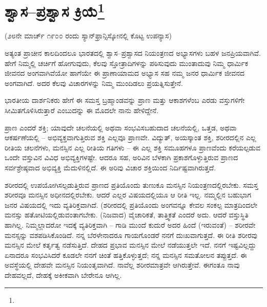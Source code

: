 
\chapter[ಶ್ವಾಸ–ಪ್ರಶ್ವಾಸ ಕ್ರಿಯೆ]{ಶ್ವಾಸ–ಪ್ರಶ್ವಾಸ ಕ್ರಿಯೆ\protect\footnote{}}

\begin{center}
(೨೮ನೇ ಮಾರ್ಚ್ ೧೯೦೦ ರಂದು ಸ್ಯಾನ್‌ಫ್ರಾನ್ಸಿಸ್ಕೋನಲ್ಲಿ ಕೊಟ್ಟ ಉಪನ್ಯಾಸ)
\end{center}

ಅತ್ಯಂತ ಪ್ರಾಚೀನ ಕಾಲದಿಂದಲೂ ಭಾರತದಲ್ಲಿ ಶ್ವಾಸ–ಪ್ರಶ್ವಾಸದ ನಿಯಂತ್ರಣದ ಅಭ್ಯಾಸಗಳು ಬಹಳ ಜನಪ್ರಿಯವಾಗಿವೆ. ಹೇಗೆ ನಿಮ್ಮಲ್ಲಿ ಚರ್ಚಿಗೆ ಹೋಗುವುದು, ಕೆಲವು ಸ್ತೋತ್ರಾದಿಗಳನ್ನು ಪಠಿಸುವುದು ಮುಂತಾದುವು ನಿಮ್ಮ ಧಾರ್ಮಿಕ ಜೀವನದ ಅಂಗವಾಗಿವೆಯೋ ಹಾಗೆಯೇ ಈ ಪ್ರಾಣಾಯಾಮದ ಅಭ್ಯಾಸ ಸಹ ನಮ್ಮ ಜನರ ಧಾರ್ಮಿಕ ಜೀವನದ ಅಂಗವಾಗಿದೆ. ಅದರ ಕೆಲವು ವಿಚಾರಗಳನ್ನು ನಿಮ್ಮ ಮುಂದಿಡಲು ಪ್ರಯತ್ನಿಸುತ್ತೇನೆ.

\vskip 1.5pt

ಭಾರತೀಯ ದಾರ್ಶನಿಕರು ಹೇಗೆ ಈ ಸಮಸ್ತ ಬ್ರಹ್ಮಾಂಡವನ್ನು ಪ್ರಾಣ ಮತ್ತು ಆಕಾಶಗಳೆಂಬ ಎರಡು ವಸ್ತುಗಳಿಗೇ ಸೀಮಿತಗೊಳಿಸಿರುತ್ತಾರೆ ಎಂಬುದನ್ನು ಈ ಮೊದಲೇ ನಾನು ಹೇಳಿದ್ದೇನೆ.

\vskip 1.5pt

ಪ್ರಾಣ ಎಂದರೆ ಶಕ್ತಿ; ಯಾವುದೇ ಚಲನೆಯಲ್ಲಿ ಅಥವಾ ಸಂಭವಿಸಬಹುದಾದ ಚಲನೆಯಲ್ಲಿ, ಒತ್ತಡ, ಅಥವಾ ಆಕರ್ಷಣೆಯಲ್ಲಿ – ಅಭಿವ್ಯಕ್ತವಾಗುತ್ತಿರುವ ಶಕ್ತಿ ಎಲ್ಲವೂ ಪ್ರಾಣವೇ. ವಿದ್ಯುತ್, ಅಯಸ್ಕಾಂತ ಶಕ್ತಿ, ಶರೀರದಲ್ಲಿನ ಎಲ್ಲ ರೀತಿಯ ಚಲನೆಗಳು, ಮನಸ್ಸಿನ ಎಲ್ಲ ರೀತಿಯ ಗತಿಗಳು – ಈ ಎಲ್ಲ ಶಕ್ತಿ ಸಮೂಹಗಳೂ ಪ್ರಾಣವೆಂದು ಕರೆಯಲ್ಪಡುವ ಒಂದೇ ವಸ್ತುವಿನ ವಿವಿಧ ಅಭಿವ್ಯಕ್ತಿಗಳಷ್ಟೇ. ಆದರೂ ಸಹ, ಅರಿವಿನ ಬೆಳಕಾಗಿ ಪ್ರಕಾಶಗೊಳ್ಳುತ್ತಿರುವ ಪ್ರಾಣದ ಸರ್ವಶ್ರೇಷ್ಠವಾದ ಅಭಿವ್ಯಕ್ತಿ ಮೆದುಳಿನಲ್ಲಿದೆ. ಈ ಅರಿವು ವಿಚಾರ ಶಕ್ತಿಯಿಂದ ನಿರ್ದಿಷ್ಟವಾಗಿರುತ್ತದೆ.

\vskip 1.5pt

ಶರೀರದಲ್ಲಿ ಉಪಯೋಗಿಸಲ್ಪಡುತ್ತಿರುವ ಪ್ರಾಣದ ಪ್ರತಿಯೊಂದು ತುಣುಕೂ ಮನಸ್ಸಿನ ನಿಯಂತ್ರಣದಲ್ಲಿರಬೇಕು. ಸಮಸ್ತ ಶರೀರವೂ ಮನಸ್ಸಿನ ಅಧೀನದಲ್ಲಿರಬೇಕು. ಆದರೆ ಎಲ್ಲರ ವಿಷಯದಲ್ಲಿಯೂ ಆ ರೀತಿ ಇಲ್ಲ. ನಮ್ಮಲ್ಲಿನ ಬಹುಭಾಗ ಜನರ ವಿಷಯದಲ್ಲಿ ಇದು ವ್ಯತಿರಿಕ್ತವಾಗಿದೆ. (ಶರೀರದಲ್ಲಿ ಪ್ರತಿಯೊಂದು ಅಂಗವನ್ನೂ ಕೇವಲ ಸಂಕಲ್ಪ ಮಾತ್ರದಿಂದಲೇ ಮನಸ್ಸು ಹತೋಟಿಯಲ್ಲಿಡುವಂತಾಗಬೇಕು. (ನಿಜವಾದ) ವೈಚಾರಿಕತೆ, ತಾತ್ತ್ವಿಕತೆ ಎಂದರೆ ಅದು. ಆದರೆ ವಸ್ತುಸ್ಥಿತಿ ಹಾಗಿಲ್ಲ. ನಿಮ್ಮಲ್ಲಾದರೋ ಇದಕ್ಕೆ ವ್ಯತಿರಿಕ್ತವಾಗಿ – ಗಾಡಿ ಮುಂದೆ ಕುದುರೆ ಅದರ ಹಿಂದೆ (ಇರುವಂತೆ) – ಶರೀರವೇ ಮನಸ್ಸನ್ನು ವಶಪಡಿಸಿಕೊಂಡಿದೆ. ನನ್ನ ಬೆರಳೇನಾದರೂ ಗಾಯಗೊಂಡರೆ ನನಗೆ ದುಃಖವಾಗುತ್ತದೆ. ಈ ರೀತಿ ಶರೀರವು ಮನಸ್ಸಿನ ಮೇಲೆ ಕರ್ತೃತ್ವ ನಡೆಸುತ್ತಿದೆ. ದೇಹದ ಪ್ರಭಾವ ಮನಸ್ಸಿನ ಮೇಲೆ ನಡೆಯುತ್ತಲೇ ಇದೆ. ನನಗೆ ಇಷ್ಟವಿಲ್ಲದ್ದು ಏನಾದರೂ ಸಂಭವಿಸಿದರೆ ಕೂಡಲೇ ನನಗೆ ಚಿಂತೆ ಹತ್ತಿಕೊಳ್ಳುತ್ತದೆ; ನನ್ನ ಮನಸ್ಸಿನ ಸಮತೋಲನ ತಪ್ಪುತ್ತದೆ. ಈ ಅವಸ್ಥೆಯಲ್ಲಿ ದೇಹವೇ ಮನಸ್ಸಿನ ನಿಯಂತೃವಾಗಿದೆ. ನಾವೆಲ್ಲ ಶರೀರಮಾತ್ರವೇ ಆಗಿರುತ್ತೇವೆ. ಈಗಂತೂ ನಾವು ದೇಹವಲ್ಲದೆ, ದೇಹಕ್ಕೆ ಅಕೀಕವಾಗಿ ಬೇರೇನೂ ಆಗಿಲ್ಲ.

\vskip 1.5pt

